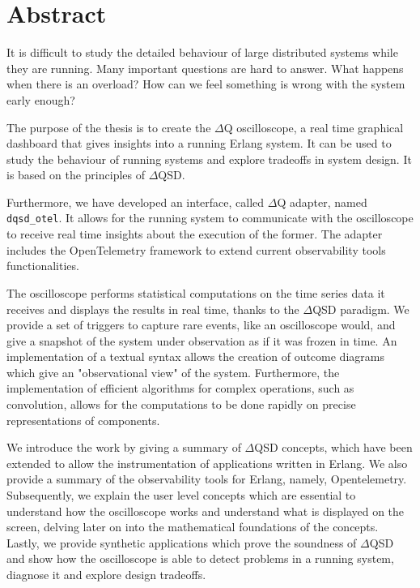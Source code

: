 \chapter*{Abstract}
    It is difficult to study the detailed behaviour of large distributed systems while they are running. Many important questions are hard to answer. What happens when there is an overload? How can we feel something is wrong with the system early enough?

    The purpose of the thesis is to create the $\Delta$Q oscilloscope, a real time graphical dashboard that gives insights into a running Erlang system. It can be used to study the behaviour of running systems and explore tradeoffs in system design. It is based on the principles of $\Delta$QSD.
  
    Furthermore, we have developed an interface, called $\Delta$Q adapter, named \texttt{dqsd\_otel}. It allows for the running system to communicate with the oscilloscope to receive real time insights about the execution of the former. The adapter includes the OpenTelemetry framework to extend current observability tools functionalities.
    
    The oscilloscope performs statistical computations on the time series data it receives and displays the results in real time, thanks to the $\Delta$QSD paradigm. We provide a set of triggers to capture rare events, like an oscilloscope would, and give a snapshot of the system under observation as if it was frozen in time. An implementation of a textual syntax allows the creation of outcome diagrams which give an "observational view" of the system. Furthermore, the implementation of efficient algorithms for complex operations, such as convolution, allows for the computations to be done rapidly on precise representations of components.

    We introduce the work by giving a summary of $\Delta$QSD concepts, which have been extended to allow the instrumentation of applications written in Erlang. We also provide a summary of the observability tools for Erlang, namely, Opentelemetry. Subsequently, we explain the user level concepts which are essential to understand how  the oscilloscope works and understand what is displayed on the screen, delving later on into the mathematical foundations of the concepts. Lastly, we provide synthetic applications which prove the soundness of $\Delta$QSD and show how the oscilloscope is able to detect problems in a running system, diagnose it and explore design tradeoffs.



